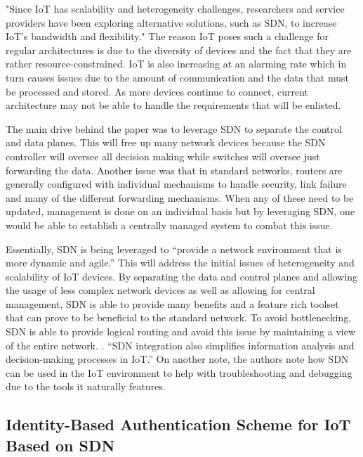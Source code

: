 "Since IoT has scalability and heterogeneity challenges, researchers and service providers have been exploring alternative solutions, such as SDN, to increase IoT's bandwidth and flexibility." \cite {kalkan2017securing} The reason IoT poses such a challenge for regular architectures is due to the diversity of devices and the fact that they are rather resource-constrained. IoT is also increasing at an alarming rate which in turn causes issues due to the amount of communication and the data that must be processed and stored. As more devices continue to connect, current architecture may not be able to handle the requirements that will be enlisted.

\smallskip

The main drive behind the paper was to leverage SDN to separate the control and data planes. This will free up many network devices because the SDN controller will oversee all decision making while switches will oversee just forwarding the data. Another issue was that in standard networks, routers are generally configured with individual mechanisms to handle security, link failure and many of the different forwarding mechanisms. When any of these need to be updated, management is done on an individual basis but by leveraging SDN, one would be able to establish a centrally managed system to combat this issue. 

\smallskip

Essentially, SDN is being leveraged to “provide a network environment that is more dynamic and agile.” \cite {kalkan2017securing} This will address the initial issues of heterogeneity and scalability of IoT devices. By separating the data and control planes and allowing the usage of less complex network devices as well as allowing for central management, SDN is able to provide many benefits and a feature rich toolset that can prove to be beneficial to the standard network. To avoid bottlenecking, SDN is able to provide logical routing and avoid this issue by maintaining a view of the entire network. . “SDN integration also simplifies information analysis and decision-making processes in IoT.” \cite {kalkan2017securing} On another note, the authors note how SDN can be used in the IoT environment to help with troubleshooting and debugging due to the tools it naturally features.

\subsection {Identity-Based Authentication Scheme for IoT Based on SDN}
